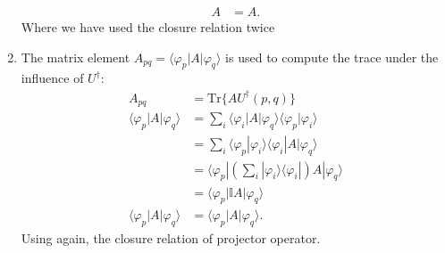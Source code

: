 \documentclass[letterpaper,11pt,twoside]{article}
\begin{document}
\begin{enumerate}[itemsep=0pt,topsep=0pt,label=\alph*.]
\begin{align*}
    A&=A.
  \end{align*}
  Where we have used the closure relation twice
  \item The matrix element $A_{pq}=\langle\varphi_p|A|\varphi_q\rangle$ is used to compute the trace under the influence of $U^\dagger$:
  \begin{align*}
    A_{pq}&=\text{Tr}\{AU^\dagger(p,q)\}\\
    \langle\varphi_p|A|\varphi_q\rangle&=\sum_i \langle\varphi_i|A|\varphi_q\rangle\langle \varphi_p|\varphi_i\rangle\\
    &=\sum_i\langle\varphi_p|\varphi_i\rangle\langle\varphi_i|A|\varphi_q\rangle\\
    &=\langle\varphi_p|\left(\sum_i|\varphi_i\rangle\langle\varphi_i|\right)A|\varphi_q\rangle\\
    &=\langle\varphi_p|\mathbb{I}A|\varphi_q\rangle\\
    \langle\varphi_p|A|\varphi_q\rangle&=\langle\varphi_p|A|\varphi_q\rangle.
  \end{align*}
  Using again, the closure relation of projector operator.
\end{enumerate}




%
\end{document}
